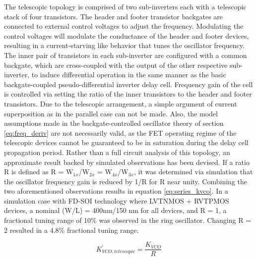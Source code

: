 			The telescopic topology is comprised of two sub-inverters each with a telescopic stack of four transistors. The header and footer transistor backgates are connected to external control voltages to adjust the frequency. Modulating the control voltages will modulate the conductance of the header and footer devices, resulting in a current-starving like behavior that tunes the oscillator frequency. The inner pair of transistors in each sub-inverter are configured with a common backgate, which are cross-coupled with the output of the other respective sub-inverter, to induce differential operation in the same manner as the basic backgate-coupled pseudo-differential inverter delay cell. Frequency gain of the cell is controlled via setting the ratio of the inner transistors to the header and footer transistors. Due to the telescopic arrangement, a simple argument of current superposition as in the parallel case can not be made. Also, the model assumptions made in the backgate-controlled oscillator theory of section \ref{eq:freq_deriv} are not necessarily valid, as the FET operating regime of the telescopic devices cannot be guaranteed to be in saturation during the delay cell propagation period. Rather than a full circuit analysis of this topology, an approximate result backed by simulated observations has been devised. If a ratio R is defined as R = W$_{1x}$/W$_{2x}$ = W$_{4x}$/W$_{3x}$, it was determined via simulation that the oscillator frequency gain is reduced by 1/R for R near unity. Combining the two aforementioned observations results in equation \ref{eq:series_kvco}. In a simulation case with FD-SOI technology where LVTNMOS + RVTPMOS devices, a nominal (W/L) = 400nm/150 nm for all devices, and R = 1, a fractional tuning range of 10\% was observed in the ring oscillator. Changing R = 2 resulted in a 4.8\% fractional tuning range.

			\begin{equation}\label{eq:series_kvco}
				K_{VCO, telescopic}^{'} = \frac{K_{VCO}}{R}
			\end{equation}

